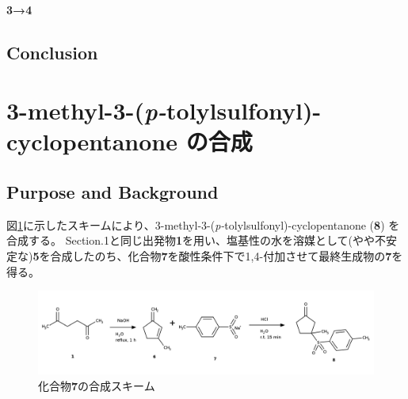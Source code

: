 \documentclass{ltjsarticle}
\theoremstyle{definition}
\numberwithin{equation}{section}
\begin{document}
\paragraph{\textbf{3}→\textbf{4}}



\subsection{Conclusion}

\section{3-methyl-3-(\textit{p-}tolylsulfonyl)-cyclopentanone の合成}
\subsection{Purpose and Background}
図\ref{scheme_6-2}に示したスキームにより、3-methyl-3-(\textit{p-}tolylsulfonyl)-cyclopentanone (\textbf{8}) を合成する。
Section.1と同じ出発物\textbf{1}を用い、塩基性の水を溶媒として(やや不安定な)\textbf{5}を合成したのち、化合物\textbf{7}を酸性条件下で1,4-付加させて最終生成物の\textbf{7}を得る。
\begin{figure}[htbp]
\begin{center}
\includegraphics[width = 15 cm]{scheme6-2.png}
\caption{化合物\textbf{7}の合成スキーム}%
\label{scheme_6-2}
\end{center}
\end{figure}
\end{document}
